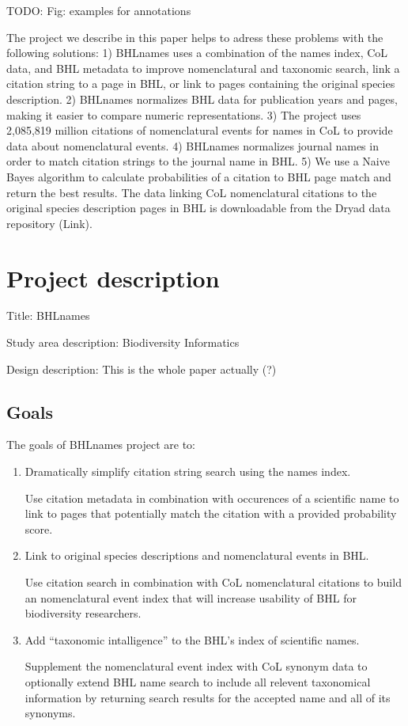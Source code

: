 \documentclass[
]{article}
\begin{document}
TODO: Fig: examples for annotations

The project we describe in this paper helps to adress these problems
with the following solutions: 1) BHLnames uses a combination of the
names index, CoL data, and BHL metadata to improve nomenclatural and
taxonomic search, link a citation string to a page in BHL, or link to
pages containing the original species description. 2) BHLnames
normalizes BHL data for publication years and pages, making it easier to
compare numeric representations. 3) The project uses 2,085,819 million
citations of nomenclatural events for names in CoL to provide data about
nomenclatural events. 4) BHLnames normalizes journal names in order to
match citation strings to the journal name in BHL. 5) We use a Naive
Bayes algorithm to calculate probabilities of a citation to BHL page
match and return the best results. The data linking CoL nomenclatural
citations to the original species description pages in BHL is
downloadable from the Dryad data repository (Link).

\hypertarget{project-description}{%
\section{Project description}\label{project-description}}

Title: BHLnames

Study area description: Biodiversity Informatics

Design description: This is the whole paper actually (?)

\hypertarget{goals}{%
\subsection{Goals}\label{goals}}

The goals of BHLnames project are to:

\begin{enumerate}
\def\labelenumi{\arabic{enumi}.}
\item
  Dramatically simplify citation string search using the names index.

  Use citation metadata in combination with occurences of a scientific
  name to link to pages that potentially match the citation with a
  provided probability score.
\item
  Link to original species descriptions and nomenclatural events in BHL.

  Use citation search in combination with CoL nomenclatural citations to
  build an nomenclatural event index that will increase usability of BHL
  for biodiversity researchers.
\item
  Add ``taxonomic intalligence'' to the BHL's index of scientific names.

  Supplement the nomenclatural event index with CoL synonym data to
  optionally extend BHL name search to include all relevent taxonomical
  information by returning search results for the accepted name and all
  of its synonyms.
\end{enumerate}
\end{document}
